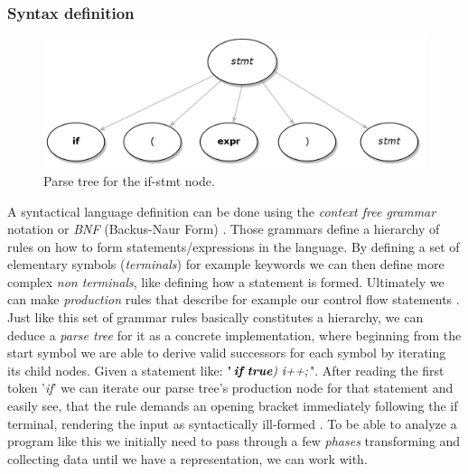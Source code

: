 \subsubsection{Syntax definition}
\begin{figure}
	\begin{center}
		\includegraphics[width=.32\textwidth, height=0.12\textheight]{PICs/parse_tree}
	\end{center}
	\caption{Parse tree for the if-stmt node.}\label{parse_tree}
\end{figure}
\vspace{-0.5cm}
A syntactical language definition can be done using the \textit{context free grammar} notation or \textit{BNF} (Backus-Naur Form) . Those grammars define a hierarchy of rules on how to form statements/expressions in the language. By defining a set of elementary symbols (\textit{terminals}) for example keywords we can then define more complex \textit{non terminals}, like defining how a statement is formed. Ultimately we can make \textit{production} rules that describe for example our control flow statements . Just like this set of grammar rules basically constitutes a hierarchy, we can deduce a \textit{parse tree} for it as a concrete implementation, where beginning from the start symbol we are able to derive valid successors for each symbol by iterating its child nodes. Given a statement like: "$\textit{\textbf{if} \textbf{true}) i++;}$". After reading the first token '\textit{if}' we can iterate our parse tree's production node for that statement and easily see, that the rule demands an opening bracket immediately following the if terminal, rendering the input as syntactically ill-formed . To be able to analyze a program like this we initially need to pass through a few \textit{phases} transforming and collecting data until we have a representation, we can work with.

